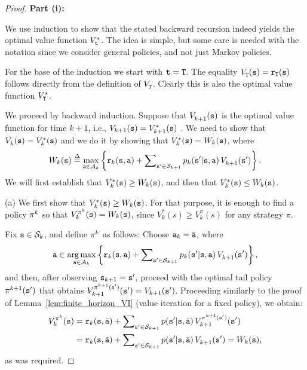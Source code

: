 \begin{proof}
\textbf{Part (i):}

We use induction to show that the stated backward recursion indeed
yields the optimal value function $V_{\tt t}^*$. The idea is simple,
but some care is needed with the notation since we consider general
policies, and not just Markov policies.

For the base of the induction we start with ${\tt t}={\tt T}$. The
equality $V_{\tt T}^{}({\tt s}) = {{\tt r}_{\tt T}}({\tt s})$
follows directly from the definition of $V_{\tt T}^{}$. Clearly
this is also the optimal value function $V^*_{{\tt T}}$.

We proceed by backward induction. Suppose that $V_{k +
1}^{}({\tt s})$ is the optimal value function for time $k + 1$, i.e.,
$V_{k + 1}({\tt s})=V^*_{k+1}({\tt s})$ . We need to show that
$V_k^{}({\tt s}) = V^*_k({\tt s})$ and we do it by showing that
$V^*_k({\tt s})={W_k}({\tt s})$, where
 \[{W_k}(\state) \buildrel \Delta \over = {\max _{\action \in {\Actions_k}}}\left\{ {{\reward_k}(\state,\action) + \sum\nolimits_{\state' \in {\States_{k + 1}}} {{p_k}(\state'|\state,\action)\,} V_{k + 1}^{}(\state')} \right\}.\]
We will first establish that $V_k^{*}({\tt s}) \ge {W_k}({\tt s})$,
and then that $V_k^{*}({\tt s}) \le {W_k}({\tt s})$.

(a) We first show that $V_k^{*}({\tt s}) \ge {W_k}({\tt s})$. For that
purpose, it is enough to find a policy ${\pi ^k}$ so that
$V_k^{{\pi ^k}}({\tt s}) = {W_k}({\tt s})$, since $V^*_k(s)\geq
V^\pi_k(s)$ for any strategy $\pi$.

Fix ${\tt s} \in {\mathcal{S}_k}$, and define ${\pi ^k}$ as follows:
Choose ${{\tt a}_k} = \bar {{\tt a}}$, where
\[\bar{{\tt a}} \in \mathop {\arg \max }\limits_{{\tt a} \in {\mathcal{A}_k}} \left\{ {{{\tt r}_k}({\tt s},{\tt a}) + \sum\nolimits_{{\tt s}' \in {\mathcal{S}_{k + 1}}} {{p_k}({\tt s}'|{\tt s},{\tt a})} \,V_{k + 1}^{}({\tt s}')} \right\},\]
and then, after observing  ${{\tt s}_{k + 1}} = {\tt s}'$, proceed
with the optimal tail policy ${\pi ^{k + 1}}({\tt s}')$ that
obtains $V_{k + 1}^{{\pi ^{k + 1}}({\tt s}')}({\tt s}') = {V_{k +
1}}({\tt s}')$. Proceeding similarly to
the proof of Lemma~\ref{lem:finite_horizon_VI} (value iteration for
a fixed policy), we obtain:
\begin{align}
V_k^{{\pi ^k}}({\tt s}) &= {{\tt r}_k}({\tt s},\bar {{\tt a}}) + \sum\nolimits_{{\tt s}' \in {\mathcal{S}_{k + 1}}} {p({\tt s}'|{\tt s},\bar {{\tt a}})\,} V_{k + 1}^{{\pi ^{k + 1}}({\tt s}')}({\tt s}')\\
 &= {{\tt r}_k}({\tt s},\bar {{\tt a}}) + \sum\nolimits_{{\tt s}' \in {\mathcal{S}_{k + 1}}} {p({\tt s}'|{\tt s},\bar {{\tt a}})} \,V_{k + 1}^{}({\tt s}') = {W_k}({\tt s}),
\end{align}
as was required.


\end{proof}
